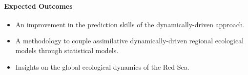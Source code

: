 \paragraph{Expected Outcomes}

\begin{itemize}

\item An improvement in the prediction skills of the dynamically-driven
approach.

\item A methodology to couple assimilative dynamically-driven regional
ecological models through statistical models.

\item Insights on the global ecological dynamics of the Red Sea.

\end{itemize}
